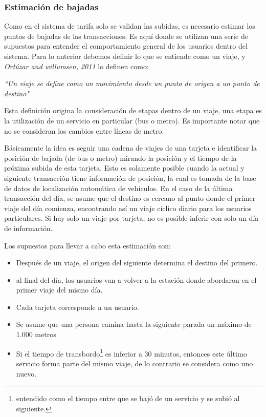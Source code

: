 \documentclass[12pt]{article}
\begin{document}
\subsubsection{Estimación de bajadas}

Como en el sistema de tarifa solo se validan las subidas, es necesario estimar los puntos de bajadas de las transacciones. Es aquí donde se utilizan una serie de supuestos para entender el comportamiento general de los usuarios dentro del sistema. Para lo anterior debemos definir lo que se entiende como un viaje, y \textit{Ortúzar and willumsen, 2011}\cite{Viaje} lo definen como:

\begin{center}
	\textit{``Un viaje se define como un movimiento desde un punto de origen a un punto de destino"}
\end{center} 

Esta definición origina la consideración de etapas dentro de un viaje, una etapa es la utilización de un servicio en particular (bus o metro). Es importante notar que no se consideran los cambios entre líneas de metro.

Básicamente la idea es seguir una cadena de viajes de una tarjeta e identificar la posición de bajada (de bus o metro) mirando la posición y el tiempo de la próxima subida de esta tarjeta. Esto es solamente posible cuando la actual y siguiente transacción tiene información de posición, la cual es tomada de la base de datos de localización automática de vehículos. En el caso de la última transacción del día, se asume que el destino es cercano al punto donde el primer viaje del día comienza, encontrando así un viaje cíclico diario para los usuarios particulares. Si hay solo un viaje por tarjeta, no es posible inferir con solo un día de información.

Los supuestos para llevar a cabo esta estimación son: 
\begin{itemize}
	\item Después de un viaje, el origen del siguiente determina el destino del primero. \cite{Supuesto_Barry}
	\item al final del día, los usuarios van a volver a la estación donde abordaron en el primer viaje del mismo día. \cite{Supuesto_Barry}
	\item Cada tarjeta corresponde a un usuario. \cite{Procesamiento_datos}
	\item Se asume que una persona camina hasta la siguiente parada un máximo de 1.000 metros \cite{Procesamiento_datos}
	\item Si el tiempo de transbordo\footnote{entendido como el tiempo entre que se bajó de un servicio y se subió al siguiente.} es inferior a 30 minutos, entonces este último servicio forma parte del mismo viaje, de lo contrario se considera como uno nuevo.\cite{Procesamiento_datos}
\end{itemize}
\end{document}
